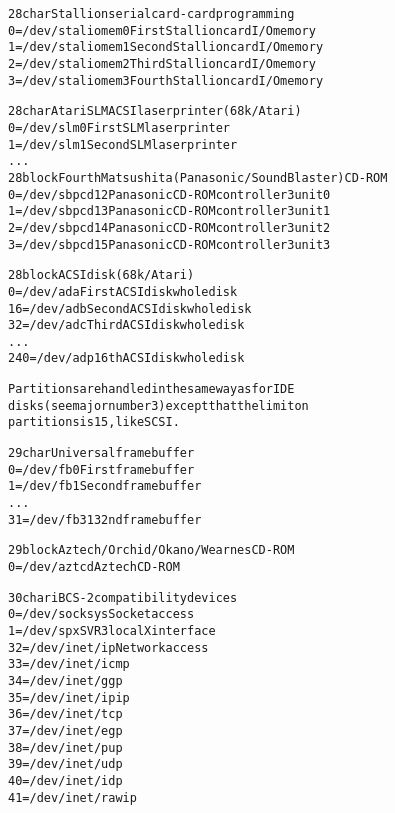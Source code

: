 \documentclass[a4paper,8pt,english]{sphinxmanual}
\begin{document}
\begin{alltt}
  28 char       Stallion serial card - card programming
                  0 = /dev/staliomem0   First Stallion card I/O memory
                  1 = /dev/staliomem1   Second Stallion card I/O memory
                  2 = /dev/staliomem2   Third Stallion card I/O memory
                  3 = /dev/staliomem3   Fourth Stallion card I/O memory

  28 char       Atari SLM ACSI laser printer (68k/Atari)
                  0 = /dev/slm0         First SLM laser printer
                  1 = /dev/slm1         Second SLM laser printer
                    ...
  28 block      Fourth Matsushita (Panasonic/SoundBlaster) CD-ROM
                  0 = /dev/sbpcd12      Panasonic CD-ROM controller 3 unit 0
                  1 = /dev/sbpcd13      Panasonic CD-ROM controller 3 unit 1
                  2 = /dev/sbpcd14      Panasonic CD-ROM controller 3 unit 2
                  3 = /dev/sbpcd15      Panasonic CD-ROM controller 3 unit 3

  28 block      ACSI disk (68k/Atari)
                  0 = /dev/ada          First ACSI disk whole disk
                 16 = /dev/adb          Second ACSI disk whole disk
                 32 = /dev/adc          Third ACSI disk whole disk
                    ...
                240 = /dev/adp          16th ACSI disk whole disk

                Partitions are handled in the same way as for IDE
                disks (see major number 3) except that the limit on
                partitions is 15, like SCSI.

  29 char       Universal frame buffer
                  0 = /dev/fb0          First frame buffer
                  1 = /dev/fb1          Second frame buffer
                    ...
                 31 = /dev/fb31         32nd frame buffer

  29 block      Aztech/Orchid/Okano/Wearnes CD-ROM
                  0 = /dev/aztcd        Aztech CD-ROM

  30 char       iBCS-2 compatibility devices
                  0 = /dev/socksys      Socket access
                  1 = /dev/spx          SVR3 local X interface
                 32 = /dev/inet/ip      Network access
                 33 = /dev/inet/icmp
                 34 = /dev/inet/ggp
                 35 = /dev/inet/ipip
                 36 = /dev/inet/tcp
                 37 = /dev/inet/egp
                 38 = /dev/inet/pup
                 39 = /dev/inet/udp
                 40 = /dev/inet/idp
                 41 = /dev/inet/rawip


\end{alltt}
\end{document}
